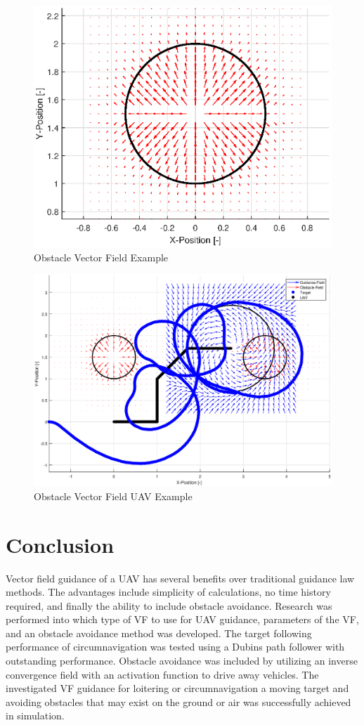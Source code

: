 \documentclass[conf]{new-aiaa}
\begin{document}
\begin{figure}[H]
	\centering
	\includegraphics[width=0.7\linewidth]{avoid}
	\caption{Obstacle Vector Field Example}
	\label{fig:avoid}
\end{figure}
\begin{figure}[H]
	\centering
	\includegraphics[width=6.5in]{avoid_color_legend}
	\caption{Obstacle Vector Field UAV Example}
	\label{fig:2avoid}
\end{figure}

\section{Conclusion}

Vector field guidance of a UAV has several benefits over traditional guidance law methods. The advantages include simplicity of calculations, no time history required, and finally the ability to include obstacle avoidance. Research was performed into which type of VF to use for UAV guidance, parameters of the VF, and an obstacle avoidance method was developed. The target following performance of circumnavigation was tested using a Dubins path follower with outstanding performance. Obstacle avoidance was included by utilizing an inverse convergence field with an activation function to drive away vehicles. The investigated VF guidance for loitering or circumnavigation a moving target and avoiding obstacles that may exist on the ground or air was successfully achieved in simulation.


\end{document}

